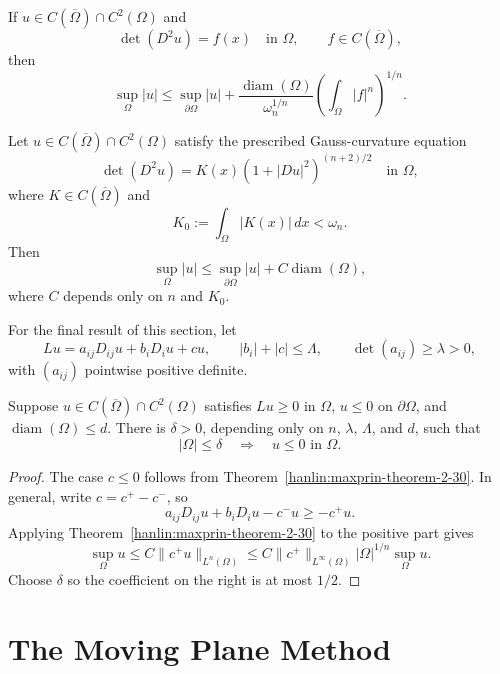 \begin{corollary}\label{hanlin:maxprin-cor-2-40}
If $u\in C(\overline\Omega)\cap C^2(\Omega)$ and
\[
\det(D^2u)=f(x)\quad\text{in }\Omega,
\qquad f\in C(\overline\Omega),
\]
then
\[
\sup_\Omega|u|\le\sup_{\partial\Omega}|u|
+\frac{\operatorname{diam}(\Omega)}{\omega_n^{1/n}}
\left(\int_\Omega|f|^n\right)^{1/n}.
\]
\end{corollary}

\begin{corollary}\label{hanlin:maxprin-cor-2-41}
Let $u\in C(\overline\Omega)\cap C^2(\Omega)$ satisfy the prescribed
Gauss-curvature equation
\[
\det(D^2u)=K(x)(1+|Du|^2)^{(n+2)/2}
\quad\text{in }\Omega,
\]
where $K\in C(\overline\Omega)$ and
\[
K_0:=\int_\Omega|K(x)|\,dx<\omega_n.
\]
Then
\[
\sup_\Omega|u|\le\sup_{\partial\Omega}|u|
+C\operatorname{diam}(\Omega),
\]
where $C$ depends only on $n$ and $K_0$.
\end{corollary}

For the final result of this section, let
\[
Lu=a_{ij}D_{ij}u+b_iD_iu+cu,
\qquad
|b_i|+|c|\le\Lambda,
\qquad
\det(a_{ij})\ge\lambda>0,
\]
with $(a_{ij})$ pointwise positive definite.

\begin{theorem}\label{hanlin:maxprin-theorem-2-42}
Suppose $u\in C(\overline\Omega)\cap C^2(\Omega)$ satisfies $Lu\ge0$ in
$\Omega$, $u\le0$ on $\partial\Omega$, and
$\operatorname{diam}(\Omega)\le d$. There is
$\delta>0$, depending only on $n$, $\lambda$, $\Lambda$, and $d$, such that
\[
|\Omega|\le\delta\quad\Longrightarrow\quad u\le0\text{ in }\Omega.
\]
\end{theorem}
\begin{proof}
\sketch The case $c\le0$ follows from
Theorem~\ref{hanlin:maxprin-theorem-2-30}. In general, write $c=c^+-c^-$, so
\[
a_{ij}D_{ij}u+b_iD_iu-c^-u\ge-c^+u.
\]
Applying Theorem~\ref{hanlin:maxprin-theorem-2-30} to the positive part gives
\[
\sup_\Omega u
\le C\|c^+u\|_{L^n(\Omega)}
\le C\|c^+\|_{L^\infty(\Omega)}|\Omega|^{1/n}\sup_\Omega u.
\]
Choose $\delta$ so the coefficient on the right is at most $1/2$.
\end{proof}

\section{The Moving Plane Method}\label{hanlin:maxprin-section-2-6}

